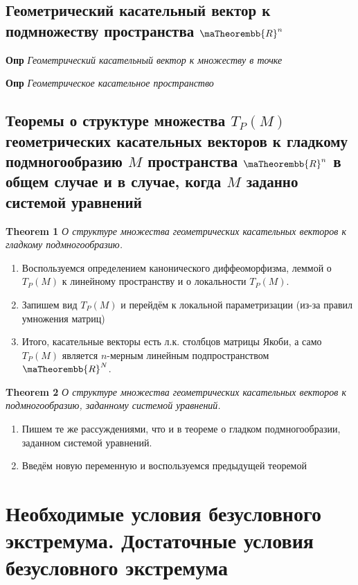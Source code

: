 \documentclass[a4paper, 14pt]{article}
\begin{document}
    \subsection{Геометрический касательный вектор к подмножеству пространства $\maTheorembb{R}^n$}
    
    \textbf{Опр} \textit{Геометрический касательный вектор к множеству в точке}
    
    \textbf{Опр} \textit{Геометрическое касательное пространство}
    
    \subsection{Теоремы о структуре множества $T_P (M)$ геометрических касательных векторов к гладкому
    подмногообразию $M$ пространства $\maTheorembb{R}^n$ в общем случае и в случае, когда $M$ заданно системой уравнений}
    
    \textbf{Theorem 1} \textit{О структуре множества геометрических касательных векторов к гладкому подмногообразию.}
    
    \begin{enumerate}
        \item Воспользуемся определением канонического диффеоморфизма, леммой о $T_P (M)$ к линейному пространству и
        о локальности $T_P (M)$.
        \item Запишем вид $T_P (M)$ и перейдём к локальной параметризации (из-за правил умножения матриц)
        \item Итого, касательные векторы есть л.к. столбцов матрицы Якоби, а само $T_P (M)$ является $n$-мерным
        линейным подпространством $\maTheorembb{R}^N$.
    \end{enumerate}
    
    \textbf{Theorem 2} \textit{О структуре множества геометрических касательных векторов к подмногообразию, заданному
    системой уравнений.}
    
    \begin{enumerate}
        \item Пишем те же рассуждениями, что и в теореме о гладком подмногообразии, заданном системой уравнений.
        \item Введём новую переменную и воспользуемся предыдущей теоремой
    \end{enumerate}
    
    \section{Необходимые условия безусловного экстремума.
    Достаточные условия безусловного экстремума}
    
\end{document}
